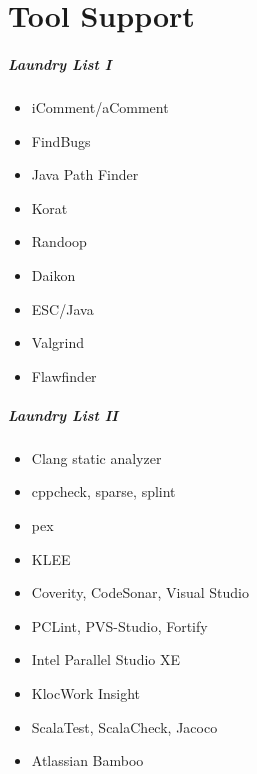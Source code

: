 \documentclass{beamer}
\newenvironment{changemargin}[1]{%
  \begin{list}{}{%
    \setlength{\topsep}{0pt}%
    \setlength{\leftmargin}{#1}%
    \setlength{\rightmargin}{1em}
    \setlength{\listparindent}{\parindent}%
    \setlength{\itemindent}{\parindent}%
    \setlength{\parsep}{\parskip}%
  }%
  \item[]}{\end{list}}
\begin{document}
\part{Tool Support}
\begin{frame}
\partpage
\end{frame}

\begin{frame}
  \frametitle{Laundry List I}
  \begin{changemargin}{2cm}
    \begin{itemize}
    \item iComment/aComment
    \item FindBugs
    \item Java Path Finder
    \item Korat
    \item Randoop
    \item Daikon
    \item ESC/Java
    \item Valgrind
    \item Flawfinder
    \end{itemize}
  \end{changemargin}
\end{frame}

\begin{frame}
  \frametitle{Laundry List II}
  \begin{changemargin}{2cm}
    \begin{itemize}
    \item Clang static analyzer
    \item cppcheck, sparse, splint
    \item pex
    \item KLEE
    \item Coverity, CodeSonar, Visual Studio
    \item PCLint, PVS-Studio, Fortify
    \item Intel Parallel Studio XE
    \item KlocWork Insight
    \item ScalaTest, ScalaCheck, Jacoco
    \item Atlassian Bamboo
    \end{itemize}
  \end{changemargin}
\end{frame}


\end{document}
